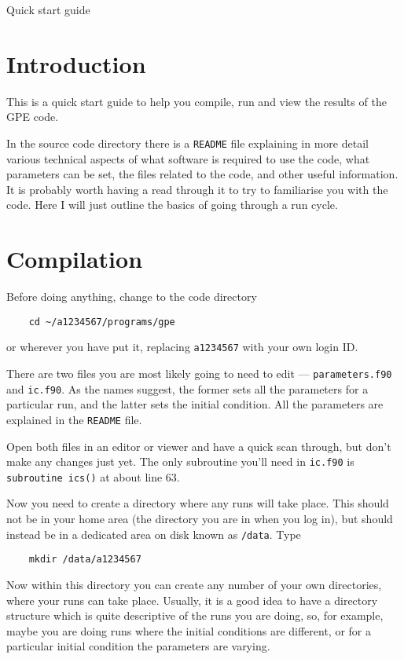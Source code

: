 
\begin{chapter}{\label{cha:quickstart} Quick start guide}
  \section{Introduction}
  This is a quick start guide to help you compile, run and view the results of
  the GPE code.

  In the source code directory there is a \verb"README" file explaining in more
  detail various technical aspects of what software is required to use the
  code, what parameters can be set, the files related to the code, and other
  useful information.  It is probably worth having a read through it to try to
  familiarise you with the code.  Here I will just outline the basics of going
  through a run cycle.

  \section{Compilation}
  Before doing anything, change to the code directory
  \begin{Verbatim}
    cd ~/a1234567/programs/gpe
  \end{Verbatim}
  or wherever you have put it, replacing \verb"a1234567" with your own login
  ID.

  There are two files you are most likely going to need to edit ---
  \verb"parameters.f90" and \verb"ic.f90".  As the names suggest, the
  former sets all the parameters for a particular run, and the latter sets the
  initial condition.  All the parameters are explained in the \verb"README"
  file.

  Open both files in an editor or viewer and have a quick scan through, but
  don't make any changes just yet.  The only subroutine you'll need in
  \verb"ic.f90" is \verb"subroutine ics()" at about line $63$.

  Now you need to create a directory where any runs will take place.  This
  should not be in your home area (the directory you are in when you log in),
  but should instead be in a dedicated area on disk known as \verb"/data".
  Type
  \begin{Verbatim}
    mkdir /data/a1234567
  \end{Verbatim}
  Now within this directory you can create any number of your own directories,
  where your runs can take place.  Usually, it is a good idea to have a
  directory structure which is quite descriptive of the runs you are doing, so,
  for example, maybe you are doing runs where the initial conditions are
  different, or for a particular initial condition the parameters are varying.


\end{chapter}

